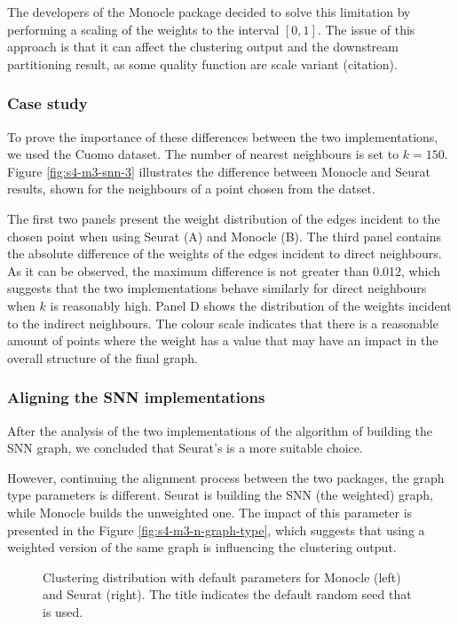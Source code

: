 The developers of the Monocle package decided to solve this limitation by performing a scaling of the weights to the interval $[0, 1]$. The issue of this approach is that it can affect the clustering output and the downstream partitioning result, as some quality function are scale variant (citation).

\subsubsection{Case study}
To prove the importance of these differences between the two implementations, we used the Cuomo \cite{Cuomo2020} dataset. The number of nearest neighbours is set to $k = 150$. Figure \ref{fig:s4-m3-snn-3} illustrates the difference between Monocle and Seurat results, shown for the neighbours of a point chosen from the datset.

The first two panels present the weight distribution of the edges incident to the chosen point when using Seurat (A) and Monocle (B). The third panel contains the absolute difference of the weights of the edges incident to direct neighbours. As it can be observed, the maximum difference is not greater than 0.012, which suggests that the two implementations behave similarly for direct neighbours when $k$ is reasonably high. Panel D shows the distribution of the weights incident to the indirect neighbours. The colour scale indicates that there is a reasonable amount of points where the weight has a value that may have an impact in the overall structure of the final graph.

\subsubsection{Aligning the SNN implementations}
After the analysis of the two implementations of the algorithm of building the SNN graph, we concluded that Seurat's is a more suitable choice.

However, continuing the alignment process between the two packages, the graph type parameters is different. Seurat is building the SNN (the weighted) graph, while Monocle builds the unweighted one. The impact of this parameter is presented in the Figure \ref{fig:s4-m3-n-graph-type}, which suggests that using a weighted version of the same graph is influencing the clustering output.

\begin{figure}[H]
    \centering
    \caption{\label{fig:s4-m3-graph-base}Clustering distribution with default parameters for Monocle (left) and Seurat (right). The title indicates the default random seed that is used.}
\end{figure}

